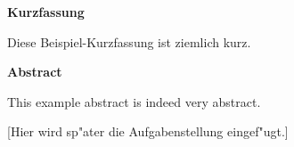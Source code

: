 \documentclass[11pt,twoside]{scrbook}
\begin{document}

\centerline{\bf Kurzfassung}

Diese Beispiel-Kurzfassung ist ziemlich kurz.

%
\vskip 3cm
%

\centerline{\bf Abstract}

This example abstract is indeed very abstract.

\cleardoublepage

\vspace*{7cm}
\centerline{[Hier wird sp"ater die Aufgabenstellung eingef"ugt.]}




\tableofcontents		%
\cleardoublepage
\listoffigures			%
\cleardoublepage
\listoftables			%
\cleardoublepage



\setcounter{page}{0}

\pagestyle{headings}


\cleardoublepage

\cleardoublepage

\cleardoublepage

\cleardoublepage
\cleardoublepage

\cleardoublepage

\cleardoublepage




\begin{appendix}


\end{appendix}
\end{document}
